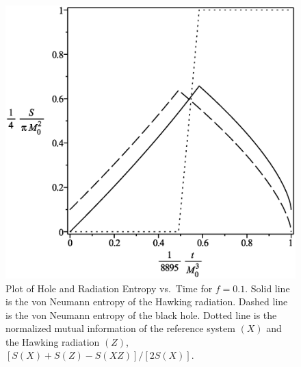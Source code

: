 \documentclass[12pt]{article}
\begin{document}
\begin{figure}[H]
\centering
\includegraphics[width=1\textwidth]{Hawking-hole-radiation-mutual-entropy-vs-time-graph-10f-is-1.eps}
\caption{Plot of Hole and Radiation Entropy vs.\ Time for $f=0.1$.
Solid line is the von Neumann entropy of the Hawking radiation.
Dashed line is the von Neumann entropy of the black hole.
Dotted line is the normalized mutual information of the reference system $(X)$ and the Hawking radiation $(Z)$, $[S(X)+S(Z)-S(XZ)]/[2S(X)]$.}
\end{figure}
\end{document}
